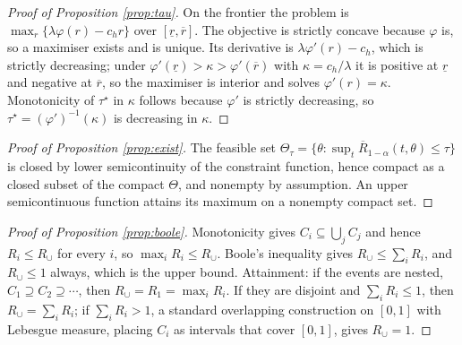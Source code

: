 \documentclass[11pt,a4paper]{article}
\theoremstyle{plain}
\theoremstyle{definition}
\theoremstyle{definition}
\theoremstyle{plain}
\begin{document}
\begin{proof}[Proof of Proposition \ref{prop:tau}]
On the frontier the problem is $\max_r \{\lambda\varphi(r) - c_h r\}$ over
$[\underline r, \overline r]$. The objective is strictly concave because
$\varphi$ is, so a maximiser exists and is unique. Its derivative is
$\lambda\varphi'(r) - c_h$, which is strictly decreasing; under
$\varphi'(\underline r) > \kappa > \varphi'(\overline r)$ with $\kappa = c_h /
\lambda$ it is positive at $\underline r$ and negative at $\overline r$, so the
maximiser is interior and solves $\varphi'(r) = \kappa$. Monotonicity of
$\tau^\star$ in $\kappa$ follows because $\varphi'$ is strictly decreasing, so
$\tau^\star = (\varphi')^{-1}(\kappa)$ is decreasing in $\kappa$.
\end{proof}

\begin{proof}[Proof of Proposition \ref{prop:exist}]
The feasible set $\Theta_\tau = \{\theta : \sup_{t}\overline{R}_{1-\alpha}(t,\theta) \leq
\tau\}$ is closed by lower semicontinuity of the constraint function, hence
compact as a closed subset of the compact $\Theta$, and nonempty by assumption.
An upper semicontinuous function attains its maximum on a nonempty compact set.
\end{proof}

\begin{proof}[Proof of Proposition \ref{prop:boole}]
Monotonicity gives $C_i \subseteq \bigcup_j C_j$ and hence $R_i \leq R_\cup$
for every $i$, so $\max_i R_i \leq R_\cup$. Boole's inequality gives $R_\cup
\leq \sum_i R_i$, and $R_\cup \leq 1$ always, which is the upper bound.
Attainment: if the events are nested, $C_1 \supseteq C_2 \supseteq \cdots$,
then $R_\cup = R_1 = \max_i R_i$. If they are disjoint and $\sum_i R_i \leq 1$,
then $R_\cup = \sum_i R_i$; if $\sum_i R_i > 1$, a standard overlapping
construction on $[0,1]$ with Lebesgue measure, placing $C_i$ as intervals that
cover $[0,1]$, gives $R_\cup = 1$.
\end{proof}
\end{document}
